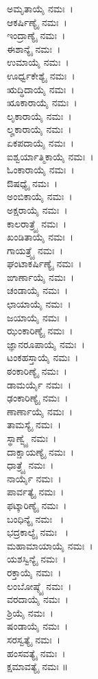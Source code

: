 \begin{multicols}{2}
 ಅಮೃತಾಯೈ ನಮಃ~।\\  ಆಕರ್ಷಿಣ್ಯೈ ನಮಃ~।\\  ಇಂದ್ರಾಣ್ಯೈ ನಮಃ~।\\  ಈಶಾನ್ಯೈ ನಮಃ~।\\  ಉಮಾಯೈ ನಮಃ~।\\  ಊರ್ಧ್ವಕೇಶ್ಯೈ ನಮಃ~।\\  ಋದ್ಧಿದಾಯೈ ನಮಃ~।\\  ೠಕಾರಾಯೈ ನಮಃ~।\\  ಲೃಕಾರಾಯೈ ನಮಃ~।\\  ಲೄಕಾರಾಯೈ ನಮಃ~।\\  ಏಕಪದಾಯೈ ನಮಃ~।\\  ಐಶ್ವರ್ಯಾತ್ಮಿಕಾಯೈ ನಮಃ~।\\  ಓಂಕಾರಾಯೈ ನಮಃ~।\\  ಔಷಧ್ಯೈ ನಮಃ~।\\  ಅಂಬಿಕಾಯೈ ನಮಃ~।\\  ಅಕ್ಷರಾಯೈ ನಮಃ~।\\  ಕಾಲರಾತ್ರ್ಯೈ ನಮಃ~।\\  ಖಂಡಿತಾಯೈ ನಮಃ~।\\  ಗಾಯತ್ರ್ಯೈ ನಮಃ~।\\  ಘಂಟಾಕರ್ಷಿಣ್ಯೈ ನಮಃ~।\\  ಙಾರ್ಣಾಯೈ ನಮಃ~।\\  ಚಂಡಾಯೈ ನಮಃ~।\\  ಛಾಯಾಯೈ ನಮಃ~।\\  ಜಯಾಯೈ ನಮಃ~।\\  ಝಂಕಾರಿಣ್ಯೈ ನಮಃ~।\\  ಜ್ಞಾನರೂಪಾಯೈ ನಮಃ~।\\  ಟಂಕಹಸ್ತಾಯೈ ನಮಃ~।\\  ಠಂಕಾರಿಣ್ಯೈ ನಮಃ~।\\  ಡಾಮರ್ಯೈ ನಮಃ~।\\  ಢಂಕಾರಿಣ್ಯೈ ನಮಃ~।\\  ಣಾರ್ಣಾಯೈ ನಮಃ~।\\  ತಾಮಸ್ಯೈ ನಮಃ~।\\  ಸ್ಥಾಣ್ವ್ಯೈ ನಮಃ~।\\  ದಾಕ್ಷಾಯಣ್ಯೈ ನಮಃ~।\\  ಧಾತ್ರ್ಯೈ ನಮಃ~।\\  ನಾರ್ಯೈ ನಮಃ~।\\  ಪಾರ್ವತ್ಯೈ ನಮಃ~।\\  ಫಟ್ಕಾರಿಣ್ಯೈ ನಮಃ~।\\  ಬಂಧಿನ್ಯೈ ನಮಃ ~।\\  ಭದ್ರಕಾಲ್ಯೈ ನಮಃ ~।\\  ಮಹಾಮಾಯಾಯೈ ನಮಃ~।\\  ಯಶಸ್ವಿನ್ಯೈ ನಮಃ~।\\  ರಕ್ತಾಯೈ ನಮಃ~।\\  ಲಂಬೋಷ್ಠ್ಯೈ ನಮಃ~।\\  ವರದಾಯೈ ನಮಃ~।\\  ಶ್ರಿಯೈ ನಮಃ~।\\  ಷಂಡಾಯೈ ನಮಃ~।\\  ಸರಸ್ವತ್ಯೈ ನಮಃ~।\\  ಹಂಸವತ್ಯೈ ನಮಃ~।\\  ಕ್ಷಮಾವತ್ಯೈ ನಮಃ ॥
\end{multicols}
